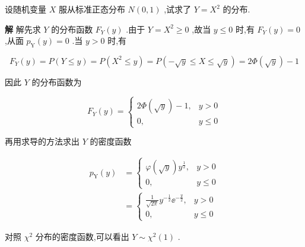 \begin{example}\label{exam:2.6.3}
	设随机变量 $ X $ 服从标准正态分布 $ N(0,1) $ ,试求了 $ Y=X^{2} $ 的分布.
	
	\textbf{解} 解先求 $ Y $ 的分布函数 $ F_{Y}(y) $ .由于 $ Y=X^{2} \geqslant 0 $ ,故当 $ y \leqslant 0 $ 时,有 $ F_{Y}(y)=0 $ ,从面 $ p_{\mathrm{Y}}(y)=0 $ .当 $ y>0 $ 时,有
	
	\[
	F_{Y}(y)=P(Y \leqslant y)=P\left(X^{2} \leqslant y\right)=P(-\sqrt{y} \leqslant X \leqslant \sqrt{y})=2 \Phi(\sqrt{y})-1
	\]
	
	因此 $ Y $ 的分布函数为
	
	\[
	F_{Y}(y)=\left\{\begin{array}{cl}{2 \Phi(\sqrt{y})-1,} & {y>0} \\ {0,} & {y \leqslant 0}\end{array}\right.
	\]
	
	再用求导的方法求出 $ Y $ 的密度函数
	
	\[
	\begin{array}{ll}
	{p_{\mathrm{Y}}(y)} & {=\left\{
		\begin{array}{ll}
		{\varphi(\sqrt{y}) y^{\frac{1}{2}},} & {y>0} \\ 
		{0,} & {y \leqslant 0}
		\end{array}\right.}\\
	{} & {=\left\{
		\begin{array}{ll}
		{\frac{1}{\sqrt{2 \pi}} y^{-\frac{1}{2}} \ee ^{-\frac{y}{2}},} &  {y>0} \\ 
		{0,} &  {y \leqslant 0}
		\end{array}\right.}
	\end{array}
	\]
	
	对照 $ \chi^{2} $ 分布的密度函数,可以看出 $ Y \sim \chi^{2}(1) $ .	
\end{example}

